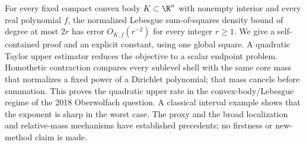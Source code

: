 
For every fixed compact convex body $K\subset\R^n$ with nonempty
interior and every real polynomial $f$, the normalized Lebesgue
sum-of-squares density bound of degree at most $2r$ has error
$O_{K,f}(r^{-2})$ for every integer $r\ge1$.
We give a self-contained proof and an explicit constant, using one
global square. A quadratic Taylor upper estimator reduces the objective
to a scalar endpoint problem. Homothetic contraction compares every
sublevel shell with the same core mass that normalizes a fixed power of
a Dirichlet polynomial; that mass cancels before summation. This proves
the quadratic upper rate in the convex-body/Lebesgue regime of the
2018 Oberwolfach question. A classical interval example shows that the
exponent is sharp in the worst case. The proxy and the broad
localization and relative-mass mechanisms have established precedents;
no firstness or new-method claim is made.

